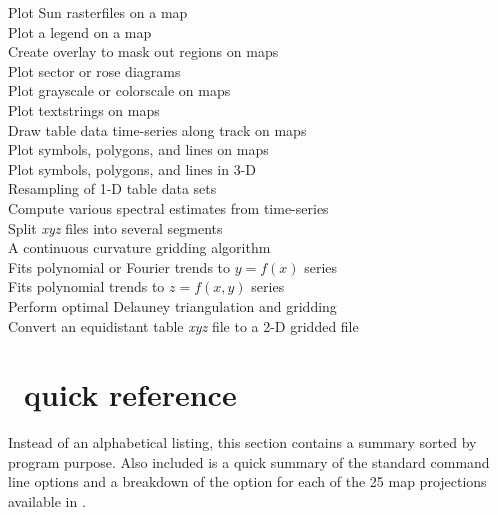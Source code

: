 \begin{tabbing}
	\>	Plot Sun rasterfiles on a map \\ 
	\>	Plot a legend on a map \\ 
	\>	Create overlay to mask out regions on maps \\ 
	\>	Plot sector or rose diagrams \\ 
	\>	Plot grayscale or colorscale on maps \\ 
	\>	Plot textstrings on maps \\ 
	\>	Draw table data time-series along track on maps \\ 
		\>	Plot symbols, polygons, and lines on maps \\ 
		\>	Plot symbols, polygons, and lines in 3-D \\ 
	\>	Resampling of 1-D table data sets \\ 
	\>	Compute various spectral estimates from time-series \\ 
	\>	Split {\it xyz} files into several segments \\ 
	\>	A continuous curvature gridding algorithm \\ 
	\>	Fits polynomial or Fourier trends to $y = f(x)$ series \\ 
	\>	Fits polynomial trends to $z = f(x,y)$ series \\ 
	\>	Perform optimal Delauney triangulation and gridding \\ 
	\>	Convert an equidistant table {\it xyz} file to a 2-D gridded file
\end{tabbing}

\section{\gmt\ quick reference}
\label{sec:purpose}
Instead of an alphabetical listing, this section contains a summary
sorted by program purpose.  Also included is a quick summary of the
standard command line options and a breakdown of the  option
for each of the 25 map projections available in \GMT. \\

